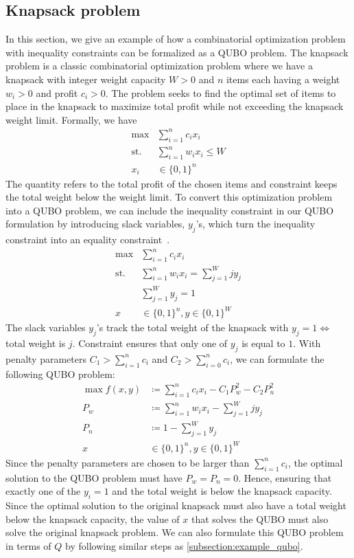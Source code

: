 \subsection{Knapsack problem}
In this section, we give an example of how a combinatorial optimization problem with inequality constraints can be formalized as a QUBO problem. The knapsack problem is a classic combinatorial optimization problem where we have a knapsack with integer weight capacity $W > 0$ and $n$ items each having a weight $w_i > 0$ and profit $c_i > 0$. The problem seeks to find the optimal set of items to place in the knapsack to maximize total profit while not exceeding the knapsack weight limit. Formally, we have
\begin{align}
\max &\sum_{i=1}^n c_i x_i \label{eq:knapsack_cost}\\
\mathrm{st.} &\sum_{i=1}^n w_i x_i \leq W \label{eq:knapsack_constraint}\\
x_i &\in \{0,1\}^n \nonumber
\end{align}
The quantity  refers to the total profit of the chosen items and constraint  keeps the total weight below the weight limit. To convert this optimization problem into a QUBO problem, we can include the inequality constraint in our QUBO formulation by introducing slack variables, $y_j$'s, which turn the inequality constraint into an equality constraint~\cite{b6}.
\begin{align}
\max &\sum_{i=1}^n c_i x_i \\
\mathrm{st.} &\sum_{i=1}^n w_i x_i = \sum_{j=1}^W jy_j \label{eq:knapsack_slack_weight}\\
&\sum_{j=1}^W y_j = 1 \label{eq:knapsack_slack_sum}\\
x &\in \{0,1\}^n, y \in \{0,1\}^W \nonumber
\end{align}
The slack variables $y_j$'s track the total weight of the knapsack with $y_j = 1 \Leftrightarrow$ total weight is $j$. Constraint  ensures that only one of $y_j$ is equal to $1$. With penalty parameters $C_1 > \sum_{i=1}^n c_i$ and $C_2 > \sum_{i=0}^n c_i$, we can formulate the following QUBO problem:
\begin{align}
    \max f(x, y) &\coloneqq \sum_{i=1}^n c_i x_i - C_1 P_w^2 - C_2 P_n^2 \\
    P_w &\coloneqq \sum_{i=1}^n w_i x_i - \sum_{j=1}^W jy_j \\
    P_n &\coloneqq 1 - \sum_{j=1}^W y_j \\
    x &\in \{0,1\}^n, y \in \{0,1\}^W \nonumber
\end{align}
Since the penalty parameters are chosen to be larger than $\sum_{i=1}^n c_i$, the optimal solution to the QUBO problem must have $P_w = P_n = 0$. Hence, ensuring that exactly one of the $y_i=1$ and the total weight is below the knapsack capacity. Since the optimal solution to the original knapsack must also have a total weight below the knapsack capacity, the value of $x$ that solves the QUBO must also solve the original knapsack problem. We can also formulate this QUBO problem in terms of $Q$ by following similar steps as \autoref{subsection:example_qubo}.

